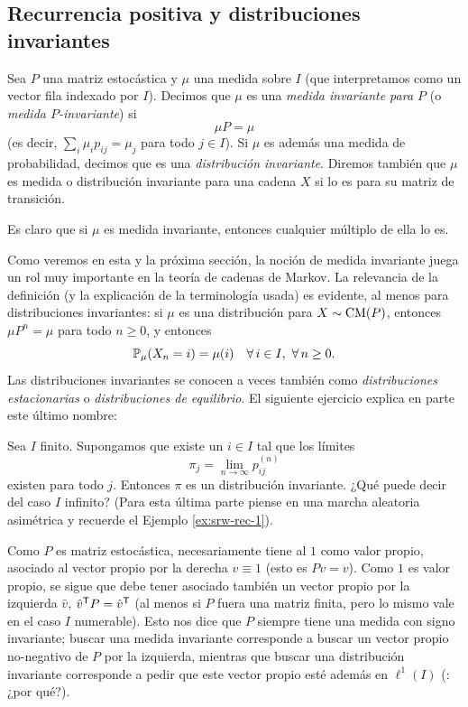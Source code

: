 \subsection{Recurrencia positiva y distribuciones invariantes}

\begin{defn}
Sea $P$ una matriz estocástica y $\mu$ una medida sobre $I$ (que interpretamos como un vector fila indexado por $I$).
Decimos que $\mu$ es una \emph{medida invariante para $P$} (o \emph{medida $P$-invariante}) si
\[\mu P=\mu\]
(es decir, $\sum_i\mu_{i}p_{ij}=\mu_j$ para todo $j\in I$).
Si $\mu$ es además una medida de probabilidad, decimos que es una \emph{distribución invariante}.
Diremos también que $\mu$ es medida o distribución invariante para una cadena $X$ si lo es para su matriz de transición.
\end{defn}

Es claro que si $\mu$ es medida invariante, entonces cualquier múltiplo de ella lo es.

Como veremos en esta y la próxima sección, la noción de medida invariante juega un rol muy importante en la teoría de cadenas de Markov.
La relevancia de la definición (y la explicación de la terminología usada) es evidente, al menos para distribuciones invariantes: si $\mu$ es una distribución para $X\sim\text{\upshape{CM}}(P)$, entonces $\mu P^n=\mu$ para todo $n\geq0$, y entonces
\[\mathbb{P}_\mu(X_n=i)=\mu(i)\quad\forall\,i\in I,~\forall\,n\geq0.\]
Las distribuciones invariantes se conocen a veces también como \emph{distribuciones estacionarias} o \emph{distribuciones de equilibrio}.
El siguiente ejercicio explica en parte este último nombre:

\begin{exer}\label{exer:pijnf}
Sea $I$ finito.
Supongamos que existe un $i\in I$ tal que los límites
\[\pi_j=\lim_{n\to\infty}p^{(n)}_{ij}\]
existen para todo $j$.
Entonces $\pi$ es un distribución invariante.
¿Qué puede decir del caso $I$ infinito? 
(Para esta última parte piense en una marcha aleatoria asimétrica y recuerde el Ejemplo \ref{ex:srw-rec-1}).
\end{exer}

\begin{rem}
Como $P$ es matriz estocástica, necesariamente tiene al $1$ como valor propio, asociado al vector propio por la derecha $v\equiv1$ (esto es $Pv=v$).
Como $1$ es valor propio, se sigue que debe tener asociado también un vector propio por la izquierda $\hat v$, $\hat v^{\sf T}P=\hat v^{\sf T}$ (al menos si $P$ fuera una matriz finita, pero lo mismo vale en el caso $I$ numerable).
Esto nos dice que $P$ siempre tiene una medida con signo invariante; buscar una medida invariante corresponde a buscar un vector propio no-negativo de $P$ por la izquierda, mientras que buscar una distribución invariante corresponde a pedir que este vector propio esté además en $\ell^1(I)$ (\uexers: ¿por qué?).
\end{rem}

